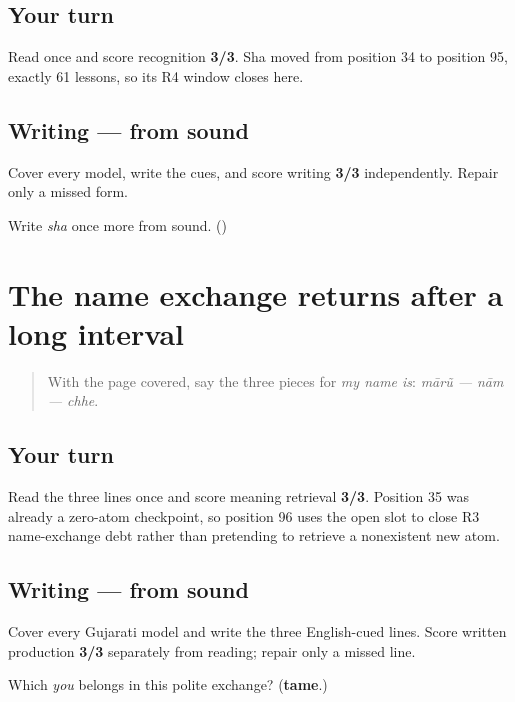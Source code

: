 \subsection*{Your turn}
Read \textbf{  } once and score recognition \textbf{3/3}. Sha moved from position 34 to position 95, exactly 61 lessons, so its R4 window closes here.

\subsection*{Writing — from sound}
Cover every model, write the cues, and score writing \textbf{3/3} independently. Repair only a missed form.

\begin{tcolorbox}[breakable,colback=teal!4,colframe=teal!35!black,title={Before you move on}]
Write \emph{sha} once more from sound. (\textbf{})
\end{tcolorbox}
\section[Practice]{The name exchange returns after a long interval}

\label{lesson:GU-R15-name-exchange-r3}



\begin{quote}
With the page covered, say the three pieces for \emph{my name is}: \emph{mārũ — nām — chhe}.
\end{quote}

\subsection*{Your turn}
Read the three lines once and score meaning retrieval \textbf{3/3}. Position 35 was already a zero-atom checkpoint, so position 96 uses the open slot to close R3 name-exchange debt rather than pretending to retrieve a nonexistent new atom.

\subsection*{Writing — from sound}
Cover every Gujarati model and write the three English-cued lines. Score written production \textbf{3/3} separately from reading; repair only a missed line.

\begin{tcolorbox}[breakable,colback=teal!4,colframe=teal!35!black,title={Before you move on}]
Which \emph{you} belongs in this polite exchange? (\textbf{tame}.)
\end{tcolorbox}
